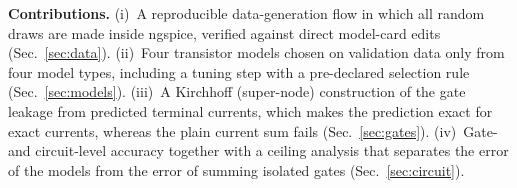 \textbf{Contributions.}
(i)~A reproducible data-generation flow in which all random draws are made inside ngspice, verified against direct model-card edits (Sec.~\ref{sec:data}).
(ii)~Four transistor models chosen on validation data only from four model types, including a tuning step with a pre-declared selection rule (Sec.~\ref{sec:models}).
(iii)~A Kirchhoff (super-node) construction of the gate leakage from predicted terminal currents, which makes the prediction exact for exact currents, whereas the plain current sum fails (Sec.~\ref{sec:gates}).
(iv)~Gate- and circuit-level accuracy together with a ceiling analysis that separates the error of the models from the error of summing isolated gates (Sec.~\ref{sec:circuit}).